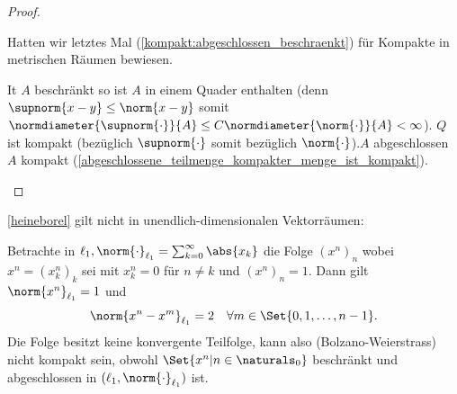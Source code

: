 \begin{proof}
    \begin{proofdescription}
        \item[\hin] Hatten wir letztes Mal (\ref{kompakt:abgeschlossen_beschraenkt}) für Kompakte in metrischen Räumen bewiesen.
        
        \item[\rueck] It \( A \) beschränkt so ist \( A \) in einem Quader enthalten (denn \( \supnorm{x-y}\leq  \norm{x-y} \) somit \( \normdiameter{\supnorm{\cdot}}{A}\leq C\normdiameter{\norm{\cdot}}{A}<\infty \)). \( Q \) ist kompakt (bezüglich \( \supnorm{\cdot} \) somit bezüglich \( \norm{\cdot} \)).\( A \) abgeschlossen \timplies \( A \) kompakt (\ref{abgeschlossene_teilmenge_kompakter_menge_ist_kompakt}).
    \end{proofdescription}
\end{proof}
\begin{bemerkung*}
    \ref{heineborel} gilt nicht in unendlich-dimensionalen Vektorräumen:

    Betrachte in \( \ell_1, \norm{\cdot}_{\ell_1}=\sum_{k=0}^{\infty}\abs{x_k} \) die Folge \( (x^n)_n \) wobei \( x^n=(x^n_k)_k \) sei mit \( x^n_k=0 \) für \( n\neq k \) und \( (x^n)_n=1 \). Dann gilt \( \norm{x^n}_{\ell_1}=1 \) und
    \begin{align*}
        \norm{x^n-x^m}_{\ell_1}=2\quad \forall m\in \Set{0,1,\dotsc,n-1}.
    \end{align*}
    \timplies Die Folge besitzt keine konvergente Teilfolge, kann also (Bolzano-Weierstrass) nicht kompakt sein, obwohl \( \Set{x^n|n\in \naturals_0} \) beschränkt und abgeschlossen in \( (\ell_1, \norm{\cdot}_{\ell_1}) \) ist.
\end{bemerkung*}
